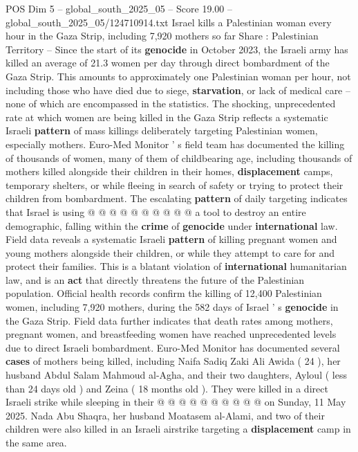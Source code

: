 \begin{textsample}{POS Dim 5 – global\_south\_2025\_05 – Score 19.00 – global\_south\_2025\_05/124710914.txt}  \label{ex:f5_pos_115}
Israel kills a Palestinian woman every hour in the Gaza Strip, including 7,920 mothers so far Share : Palestinian Territory -- Since the start of its \textbf{genocide} in October 2023, the Israeli army has killed an average of 21.3 women per day through direct bombardment of the Gaza Strip.
This amounts to approximately one Palestinian woman per hour, not including those who have died due to siege, \textbf{starvation}, or lack of medical care -- none of which are encompassed in the statistics.
The shocking, unprecedented rate at which women are being killed in the Gaza Strip reflects a systematic Israeli \textbf{pattern} of mass killings deliberately targeting Palestinian women, especially mothers.
Euro-Med Monitor ' s field team has documented the killing of thousands of women, many of them of childbearing age, including thousands of mothers killed alongside their children in their homes, \textbf{displacement} camps, temporary shelters, or while fleeing in search of safety or trying to protect their children from bombardment.
The escalating \textbf{pattern} of daily targeting indicates that Israel is using @ @ @ @ @ @ @ @ @ @ a tool to destroy an entire demographic, falling within the \textbf{crime} of \textbf{genocide} under \textbf{international} law.
Field data reveals a systematic Israeli \textbf{pattern} of killing pregnant women and young mothers alongside their children, or while they attempt to care for and protect their families.
This is a blatant violation of \textbf{international} humanitarian law, and is an \textbf{act} that directly threatens the future of the Palestinian population.
Official health records confirm the killing of 12,400 Palestinian women, including 7,920 mothers, during the 582 days of Israel ' s \textbf{genocide} in the Gaza Strip.
Field data further indicates that death rates among mothers, pregnant women, and breastfeeding women have reached unprecedented levels due to direct Israeli bombardment.
Euro-Med Monitor has documented several \textbf{cases} of mothers being killed, including Naifa Sadiq Zaki Ali Awida ( 24 ), her husband Abdul Salam Mahmoud al-Agha, and their two daughters, Ayloul ( less than 24 days old ) and Zeina ( 18 months old ).
They were killed in a direct Israeli strike while sleeping in their @ @ @ @ @ @ @ @ @ @ on Sunday, 11 May 2025.
Nada Abu Shaqra, her husband Moatasem al-Alami, and two of their children were also killed in an Israeli airstrike targeting a \textbf{displacement} camp in the same area.

\end{textsample}
